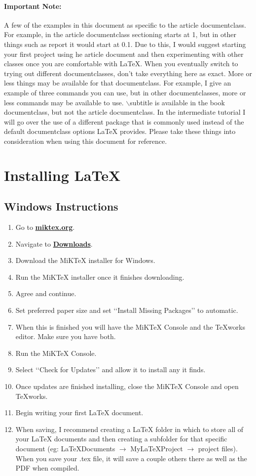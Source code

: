 \paragraph{Important Note:}
	A few of the examples in this document as specific to the article documentclass. For example, in the article documentclass sectioning starts at 1, but in other things such as report it would start at 0.1. Due to this, I would suggest starting your first project using he article document and then experimenting with other classes once you are comfortable with \LaTeX{}. When you eventually switch to trying out different documentclasses, don\rq{}t take everything here as exact. More or less things may be available for that documentclass. For example, I give an example of three commands you can use, but in other documentclasses, more or less commands may be available to use. $\backslash$subtitle is available in the book documentclass, but not the article documentclass. In the intermediate tutorial I will go over the use of a different package that is commonly used instead of the default documentclass options \LaTeX{} provides. Please take these things into consideration when using this document for reference.

\section{Installing \LaTeX{}}
	\subsection{Windows Instructions}
		\begin{enumerate}
			\item Go to \href{https://miktex.org/}{\textbf{miktex.org}}.
			\item Navigate to \href{https://miktex.org/download}{\textbf{Downloads}}.
			\item Download the MiKTeX installer for Windows.
			\item Run the MiKTeX installer once it finishes downloading.
			\item Agree and continue.
			\item Set preferred paper size and set \lq\lq{}Install Missing Packages\rq\rq{} to automatic.
			\item When this is finished you will have the MiKTeX Console and the TeXworks editor. Make sure you have both.
			\item Run the MiKTeX Console.
			\item Select \lq\lq{}Check for Updates\rq\rq{} and allow it to install any it finds.
			\item Once updates are finished installing, close the MiKTeX Console and open TeXworks.
			\item Begin writing your first \LaTeX{} document.
			\item When saving, I recommend creating a LaTeX folder in which to store all of your \LaTeX{} documents and then creating a subfolder for that specific document (eg: LaTeXDocuments \(\rightarrow\) MyLaTeXProject \(\rightarrow\) project files). When you save your .tex file, it will save a couple others there as well as the PDF when compiled.
		\end{enumerate}

